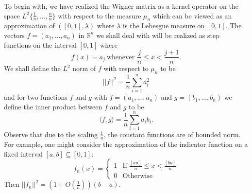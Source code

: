 \documentclass[reqno,12pt]{amsart}
\theoremstyle{plain}
\theoremstyle{definition}
\begin{document}
\noindent 
To begin with, we have realized the Wigner matrix as a kernel operator on the space $L^{2}\{\frac{1}{n},\ldots, \frac{n}{n} \}$ with respect to the measure $\mu_{n}$ which can be viewed as an approximation of $\left([0,1], \lambda\right)$ where $\lambda$ is the Lebesgue measure on $[0,1]$. The vectors $f=(a_{1},\ldots, a_{n})$ in $\mathbb{R}^n$ we shall deal with will be realized as step functions on the interval $[0,1]$ where 
\begin{equation}
f(x)= a_{j} ~ \text{whenever } \frac{j}{n}\le x < \frac{j+1}{n}.
\end{equation}
We shall define the $L^2$ norm of $f$ with respect to $\mu_{n}$ to be 
\begin{equation}
||f||^2= \frac{1}{n} \sum_{i=1}^{n} a_{i}^2
\end{equation}
and for two functions $f$ and $g$ with $f=(a_{1},\ldots, a_{n})$ and $g=(b_{1},\ldots, b_{n})$ we define the inner product between $f$ and $g$ to be 
\[
\langle f,g \rangle = \frac{1}{n} \sum_{i=1}^{n} a_{i}b_{i}.
\]
Observe that due to the scaling $\frac{1}{n}$, the constant functions are of bounded norm. For example, one might consider the approximation of the indicator function on a fixed interval  $[a,b] \subseteq [0,1]$: 
\begin{equation}\label{eq:stepfunction}
f_{n}(x)= \left\{
\begin{array}{ll}
1 & \text{If } \frac{[an]}{n} \le x < \frac{[bn]}{n}\\
0 & \text{Otherwise}
\end{array}
\right.
\end{equation}
Then $||f_{n}||^2 = \left(1+O\left( \frac{1}{n} \right)\right)(b-a)$.
\end{document}
